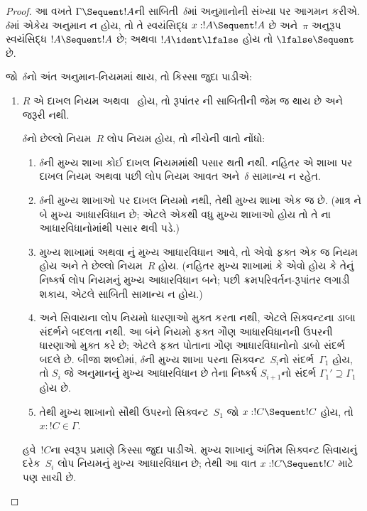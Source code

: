 \begin{proof}
આ વખતે
$\Gamma \Sequent !A$ની
સાબિતી~$\delta$માં
અનુમાનોની સંખ્યા
પર આગમન કરીએ.
$\delta$માં
એકેય અનુમાન
ન હોય, તો
તે સ્વયંસિદ્ધ
$x:!A \Sequent !A$
છે અને~$\pi$
અનુરૂપ સ્વયંસિદ્ધ
$!A \Sequent !A$
છે; અથવા
$!A
\ident \lfalse$
હોય તો
$\lfalse \Sequent \ $
છે.

જો~$\delta$નો
અંત અનુમાન-નિયમમાં
થાય, તો કિસ્સા
જુદા પાડીએ:
\begin{enumerate}
  \item $R$ એ
  દાખલ
  નિયમ અથવા~\FalseInt
  હોય, તો
  રૂપાંતર
  ની
  સાબિતીની જેમ
  જ થાય છે
  અને~\Cut
  જરૂરી નથી.

  $\delta$નો
  છેલ્લો નિયમ~$R$
  લોપ
  નિયમ હોય,
  તો નીચેની
  વાતો નોંધો:
  \begin{enumerate}
    \item $\delta$ની
    મુખ્ય શાખા
    કોઈ દાખલ
    નિયમમાંથી
    પસાર થતી
    નથી. નહિતર
    એ શાખા પર
    દાખલ
    નિયમ અથવા
    \FalseInt{}
    પછી
    લોપ
    નિયમ આવત
    અને~$\delta$
    સામાન્ય ન
    રહેત.
    \item $\delta$ની
    મુખ્ય શાખાઓ
    પર દાખલ
    નિયમો નથી,
    તેથી મુખ્ય
    શાખા એક
    જ છે.
    (માત્ર
    \Intro{\land}ને
    બે મુખ્ય
    આધારવિધાન છે;
    એટલે એકથી
    વધુ મુખ્ય
    શાખાઓ હોય
    તો તે
    \Intro{\land}ના
    આધારવિધાનોમાંથી
    પસાર થવી
    પડે.)
    \item મુખ્ય
    શાખામાં
    \Elim{\lor}
    અથવા
    \Elim{\lexists}નું
    મુખ્ય આધારવિધાન
    આવે, તો
    એવો ફક્ત
    એક જ
    નિયમ હોય
    અને તે
    છેલ્લો
    નિયમ~$R$
    હોય.
    (નહિતર
    મુખ્ય શાખામાં
    \Elim{\lor}
    કે
    \Elim{\lexists}
    એવો હોય
    કે તેનું
    નિષ્કર્ષ
    લોપ
    નિયમનું મુખ્ય
    આધારવિધાન
    બને; પછી
    ક્રમપરિવર્તન-રૂપાંતર
    લગાડી શકાય,
    એટલે સાબિતી
    સામાન્ય ન
    હોય.)
  \item \Elim{\lor}
  અને
  \Elim{\lexists}
  સિવાયના
  લોપ
  નિયમો ધારણાઓ
  મુક્ત કરતા
  નથી, એટલે
  સિક્વન્ટના
  ડાબા સંદર્ભને
  બદલતા નથી.
  આ બંને નિયમો
  ફક્ત ગૌણ
  આધારવિધાનની
  ઉપરની ધારણાઓ
  મુક્ત કરે
  છે; એટલે
  ફક્ત પોતાના
  ગૌણ આધારવિધાનોનો
  ડાબો સંદર્ભ
  બદલે છે.
  બીજા શબ્દોમાં,
  $\delta$ની
  મુખ્ય શાખા
  પરના
  સિક્વન્ટ~$S_i$નો
  સંદર્ભ~$\Gamma_1$
  હોય, તો
  $S_i$ જે
  અનુમાનનું
  મુખ્ય આધારવિધાન
  છે તેના
  નિષ્કર્ષ
  $S_{i+1}$નો
  સંદર્ભ
  $\Gamma_1' \supseteq \Gamma_1$
  હોય છે.
  \item તેથી
  મુખ્ય શાખાનો
  સૌથી ઉપરનો
  સિક્વન્ટ~$S_1$
  જો
  $x: !C \Sequent !C$
  હોય, તો
  $x:!C \in \Gamma$.
  \end{enumerate}
  હવે~$!C$ના
  સ્વરૂપ પ્રમાણે
  કિસ્સા જુદા
  પાડીએ. મુખ્ય
  શાખાનું અંતિમ
  સિક્વન્ટ સિવાયનું
  દરેક~$S_i$
  લોપ
  નિયમનું મુખ્ય
  આધારવિધાન છે;
  તેથી આ વાત
  $x:!C \Sequent !C$
  માટે પણ
  સાચી છે.


\end{enumerate}
\end{proof}
